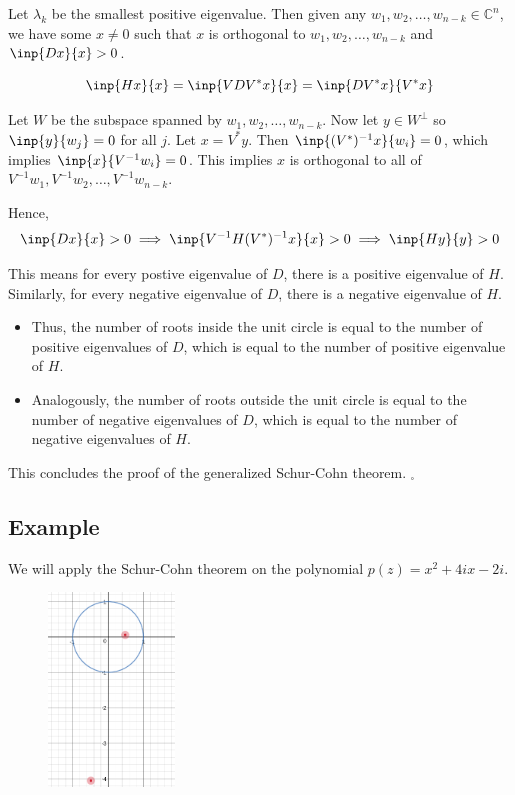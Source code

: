 \documentclass[twofold]{article}
\newcommand*\adj[1]{#1^*}
\theoremstyle{plain}
\theoremstyle{definition}
\theoremstyle{remark}
\begin{document}
Let \(\lambda_k\) be the smallest positive eigenvalue. Then given any \(w_1, w_2, \ldots , w_{n-k} \in \mathbb{C}^n\), we have some \(x \ne 0\) such that \(x\) is orthogonal to \( w_1, w_2 , \ldots , w_{n-k}\) and \(\inp{Dx}{x} > 0\).

\[\inp{Hx}{x} = \inp{VD\adj{V} x}{x} = \inp{D\adj{V} x}{\adj{V}x}\]

 Let \(W\) be the subspace spanned by \(w_1, w_2, \ldots , w_{n-k}\). Now let \(y \in W^\perp\) so \(\inp{y}{w_j} = 0\) for all \(j\). Let \(x = \adj{V}y\).  Then \( \inp{(\adj{V})^{-1}x}{w_i} = 0\), which implies  \( \inp{x}{V^{-1} w_i} = 0\). This implies \(x\) is orthogonal to all of \(V^{-1}w_1,  V^{-1} w_2, \ldots , V^{-1} w_{n-k}\).

Hence,
\[\inp{Dx}{x} > 0 \implies \inp{V^{-1} H (\adj{V})^{-1} x}{x} > 0 \implies \inp{Hy}{y} > 0\]

This means for every postive eigenvalue of \(D\), there is a positive eigenvalue of \(H\). Similarly, for every negative eigenvalue of \(D\), there is a negative eigenvalue of \(H\). 

\begin{itemize}
\item Thus, the number of roots inside the unit circle is equal to the number of positive eigenvalues of \(D\), which is equal to the number of positive eigenvalue of \(H\).
 
\item Analogously, the number of roots outside the unit circle is equal to the number of negative eigenvalues of \(D\), which is equal to the number of negative eigenvalues of \(H\).
\end{itemize}
This concludes the proof of the generalized Schur-Cohn theorem. \(_\square\)
\subsection{Example}

We will apply the Schur-Cohn theorem on the polynomial \(p(z) = x^2 + 4i x - 2i\).

\begin{figure}
\centering
\includegraphics[width=0.3\textwidth]{roots1}
\end{figure}
\end{document}
